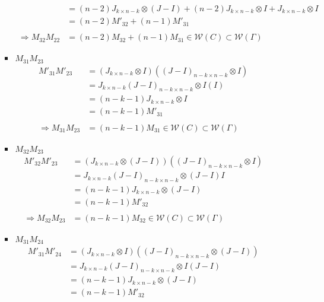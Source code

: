 \documentclass{article}
\begin{document}
\begin{itemize}
\begin{itemize}
\begin{itemize}
\begin{align*}
                &= (n-2)J_{k\times n-k}\otimes (J-I) + (n-2)J_{k\times n-k}\otimes I + J_{k\times n-k}\otimes I\\
                &= (n-2)M'_{32} + (n-1)M'_{31} \\\\
                \Rightarrow M_{32}M_{22} &= (n-2)M_{32} + (n-1)M_{31} \in \mathcal{W}(C) \subset \mathcal{W}(\Gamma)
            \end{align*}
            \item $M_{31}M_{23}$
            \begin{align*}
                M'_{31}M'_{23}
                &= (J_{k\times n-k}\otimes I)((J-I)_{n-k\times n-k} \otimes I) \\
                &= J_{k\times n-k}(J-I)_{n-k\times n-k} \otimes I(I) \\
                &= (n-k-1)J_{k\times n-k}\otimes I \\
                &= (n-k-1)M'_{31} \\\\
                \Rightarrow M_{31}M_{23} &= (n-k-1)M_{31} \in \mathcal{W}(C) \subset\mathcal{W}(\Gamma)
            \end{align*}
            \item $M_{32}M_{23}$
            \begin{align*}
                M'_{32}M'_{23}
                &= (J_{k\times n-k}\otimes (J-I))((J-I)_{n-k\times n-k} \otimes I) \\
                &= J_{k\times n-k}(J-I)_{n-k\times n-k} \otimes (J-I)I \\
                &= (n-k-1)J_{k\times n-k}\otimes (J-I) \\
                &= (n-k-1)M'_{32} \\\\
                \Rightarrow M_{32}M_{23} &= (n-k-1)M_{32} \in \mathcal{W}(C) \subset\mathcal{W}(\Gamma)
            \end{align*}
            \item $M_{31}M_{24}$
            \begin{align*}
                M'_{31}M'_{24}
                &= (J_{k\times n-k}\otimes I)((J-I)_{n-k\times n-k} \otimes (J-I)) \\
                &= J_{k\times n-k}(J-I)_{n-k\times n-k} \otimes I(J-I) \\
                &= (n-k-1)J_{k\times n-k}\otimes (J-I) \\
                &= (n-k-1)M'_{32} \\\\

\end{align*}
\end{itemize}
\end{itemize}
\end{itemize}
\end{document}
